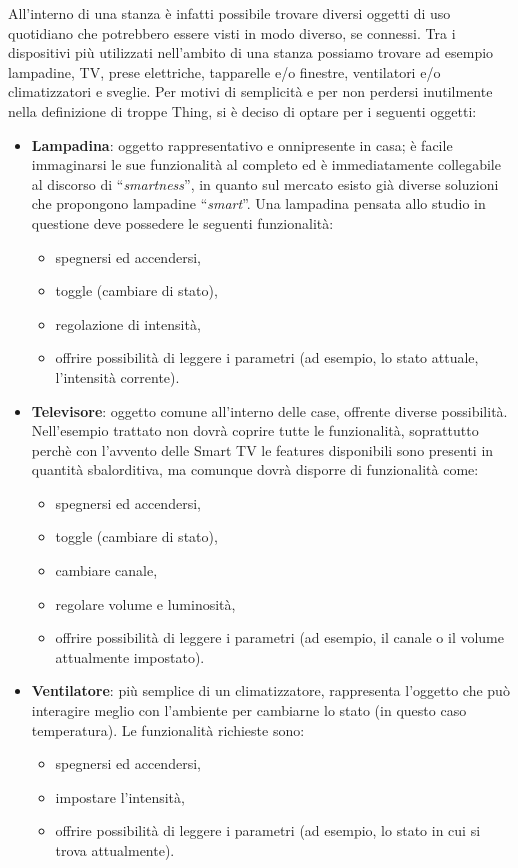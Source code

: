 \documentclass[12pt,a4paper,openright,oneside]{report}
\newcommand{\quotes}[1]{``#1''}
\begin{document}
All'interno di una stanza è infatti possibile trovare diversi oggetti di uso quotidiano che potrebbero essere visti in modo diverso, se connessi. Tra i dispositivi più utilizzati nell'ambito di una stanza possiamo trovare ad esempio lampadine, TV, prese elettriche, tapparelle e/o finestre, ventilatori e/o climatizzatori e sveglie. Per motivi di semplicità e per non perdersi inutilmente nella definizione di troppe Thing, si è deciso di optare per i seguenti oggetti:

\begin{itemize}
	\item \textbf{Lampadina}: oggetto rappresentativo e onnipresente in casa; è facile immaginarsi le sue funzionalità al completo ed è immediatamente collegabile al discorso di \quotes{\textit{smartness}}, in quanto sul mercato esisto già diverse soluzioni che propongono lampadine \quotes{\textit{smart}}. Una lampadina pensata allo studio in questione deve possedere le seguenti funzionalità:
	\begin{itemize}
		\setlength\itemsep{-0.0em}
		\item spegnersi ed accendersi,
		\item toggle (cambiare di stato),
		\item regolazione di intensità,
		\item offrire possibilità di leggere i parametri (ad esempio, lo stato attuale, l'intensità corrente).
	\end{itemize}
	
	\item \textbf{Televisore}: oggetto comune all'interno delle case, offrente diverse possibilità. Nell'esempio trattato non dovrà coprire tutte le funzionalità, soprattutto perchè con l'avvento delle Smart TV le features disponibili sono presenti in quantità sbalorditiva, ma comunque dovrà disporre di funzionalità come:
	\begin{itemize}
		\setlength\itemsep{-0.0em}
		\item spegnersi ed accendersi,
		\item toggle (cambiare di stato),
		\item cambiare canale,
		\item regolare volume e luminosità,
		\item offrire possibilità di leggere i parametri (ad esempio, il canale o il volume attualmente impostato).
	\end{itemize}
	
	\item \textbf{Ventilatore}: più semplice di un climatizzatore, rappresenta l'oggetto che può interagire meglio con l'ambiente per cambiarne lo stato (in questo caso temperatura). Le funzionalità richieste sono:
	\begin{itemize}
		\setlength\itemsep{-0.0em}
		\item spegnersi ed accendersi,
		\item impostare l'intensità,
		\item offrire possibilità di leggere i parametri (ad esempio, lo stato in cui si trova attualmente).
	\end{itemize}
	

\end{itemize}
\end{document}
